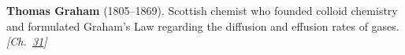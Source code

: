 \textbf{Thomas Graham} (1805–1869). Scottish chemist who founded colloid chemistry and formulated Graham's Law regarding the diffusion and effusion rates of gases. \emph{[Ch.~\hyperref[ch:osmosisdebye]{31}]}

